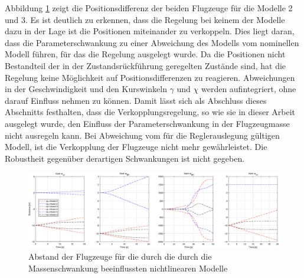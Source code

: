 Abbildung \ref{fig:distance_xyz_nlinear_twomassmodels} zeigt die Positionsdifferenz der beiden Flugzeuge für die Modelle 2 und 3. Es ist deutlich zu erkennen, dass die Regelung bei keinem der Modelle dazu in der Lage ist die Positionen miteinander zu verkoppeln. Dies liegt daran, dass die Parameterschwankung zu einer Abweichung des Modells vom nominellen Modell führen, für das die Regelung ausgelegt wurde. Da die Positionen nicht Bestandteil der in der Zustandsrückführung geregelten Zustände sind, hat die Regelung keine Möglichkeit auf Positionsdifferenzen zu reagieren. Abweichungen in der Geschwindigkeit und den Kurswinkeln $\gamma$ und $\chi$ werden aufintegriert, ohne darauf Einfluss nehmen zu können. Damit lässt sich als Abschluss dieses Abschnitts festhalten, dass die Verkopplungsregelung, so wie sie in dieser Arbeit ausgelegt wurde, den Einfluss der Parameterschwankung in der Flugzeugmasse nicht ausregeln kann. Bei Abweichung vom für die Reglerauslegung gültigen Modell, ist die Verkopplung der Flugzeuge nicht mehr gewährleistet. Die Robustheit gegenüber derartigen Schwankungen ist nicht gegeben.

\begin{figure}[h] %
	\centering
	\includegraphics[width=\linewidth]{./Bilder/distance_xyz_nlinear_twomassmodels.eps}
	\caption{Abstand der Flugzeuge für die durch die durch die Massenschwankung beeinflussten nichtlinearen Modelle}
	\label{fig:distance_xyz_nlinear_twomassmodels}
\end{figure}


